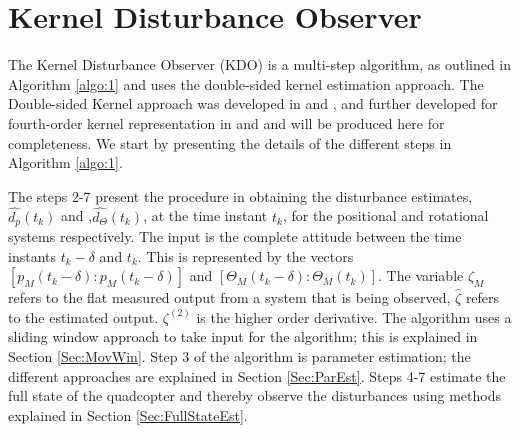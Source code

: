 \documentclass[letterpaper%
, twoside%
, 12pt%
,memoire%
, english%
,creativecommons,hyperref%
]{thETS}
\begin{document}
\chapter{Kernel Disturbance Observer} \label{Chap:KDO}
The Kernel Disturbance Observer (KDO) is a multi-step algorithm, as outlined in Algorithm \ref{algo:1} and uses the double-sided kernel estimation approach. The Double-sided Kernel approach was developed in \citep{RN119} and \citep{RN76}, and further developed for fourth-order kernel representation in \citep{RN83} and \citep{RN120} and will be produced here for completeness. We start by presenting the details of the different steps in Algorithm \ref{algo:1}. 

The steps 2-7 present the procedure in obtaining the disturbance estimates, $\hat{d_p}(t_k)$ and ,$\hat{d_\Theta}(t_k)$, at the time instant $t_k$, for the positional and rotational systems respectively. The input is the complete attitude between the time instants $t_k-\delta$ and $t_k$. This is represented by the vectors $[p_M(t_k-\delta) : p_{M}(t_k-\delta)]$ and $[\Theta_M(t_k-\delta) : \Theta_M(t_k)]$. The variable $\zeta_M$ refers to the flat measured output from a system that is being observed, $\hat{\zeta}$ refers to the estimated output. ${\zeta}^{(2)}$ is the higher order derivative. The algorithm uses a sliding window approach to take input for the algorithm; this is explained in Section \ref{Sec:MovWin}. Step 3 of the algorithm is parameter estimation; the different approaches are explained in Section \ref{Sec:ParEst}. Steps 4-7 estimate the full state of the quadcopter and thereby observe the disturbances using methods explained in Section \ref{Sec:FullStateEst}.
\end{document}
